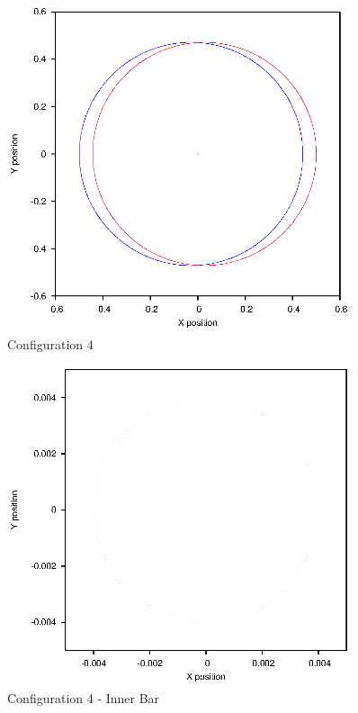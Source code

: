 \documentclass[a4paper,12pt]{article}
\begin{document}
\begin{figure}[H]
\centering
\includegraphics[width=0.9\textwidth]{./results/004-5-004/Orbit.eps}
\caption{Configuration 4}
\label{fig:config4}
\end{figure}
\begin{figure}[H]
\centering
\includegraphics[width=0.9\textwidth]{./results/004-5-004/Inner.eps}
\caption{Configuration 4 - Inner Bar}
\label{fig:config4i}
\end{figure}
\end{document}
